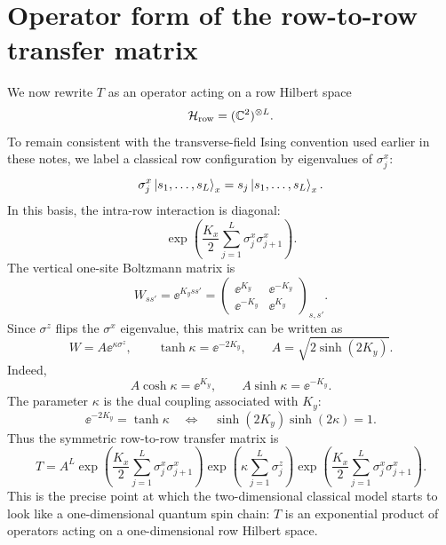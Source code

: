 \section{Operator form of the row-to-row transfer matrix}
\label{sec:2d-classical-ising-row-transfer-operator}

We now rewrite $T$ as an operator acting on a row Hilbert space
\begin{equation}
    \mathcal{H}_{\rm row}=(\mathbb{C}^2)^{\otimes L}.
\end{equation}
To remain consistent with the transverse-field Ising convention used earlier in
these notes, we label a classical row configuration by eigenvalues of
$\sigma_j^x$:
\begin{equation}
\label{eq:2d-classical-ising-x-basis}
    \sigma_j^x\left|s_1,\ldots,s_L\right\rangle_x
    =
    s_j\left|s_1,\ldots,s_L\right\rangle_x .
\end{equation}
In this basis, the intra-row interaction is diagonal:
\begin{equation}
\label{eq:2d-classical-ising-horizontal-operator}
    \exp\left(
        \frac{K_x}{2}\sum_{j=1}^{L}\sigma_j^x\sigma_{j+1}^x
    \right).
\end{equation}
The vertical one-site Boltzmann matrix is
\begin{equation}
\label{eq:2d-classical-ising-vertical-weight}
    W_{ss'}=\ee^{K_yss'}
    =
    \begin{pmatrix}
        \ee^{K_y} & \ee^{-K_y} \\
        \ee^{-K_y} & \ee^{K_y}
    \end{pmatrix}_{s,s'} .
\end{equation}
Since $\sigma^z$ flips the $\sigma^x$ eigenvalue, this matrix can be written as
\begin{equation}
\label{eq:2d-classical-ising-vertical-exp}
    W=A\ee^{\kappa\sigma^z},
    \qquad
    \tanh\kappa=\ee^{-2K_y},
    \qquad
    A=\sqrt{2\sinh(2K_y)} .
\end{equation}
Indeed,
\begin{equation}
    A\cosh\kappa=\ee^{K_y},
    \qquad
    A\sinh\kappa=\ee^{-K_y}.
\end{equation}
The parameter $\kappa$ is the dual coupling associated with $K_y$:
\begin{equation}
\label{eq:2d-classical-ising-kappa-dual}
    \ee^{-2K_y}=\tanh\kappa
    \quad\Longleftrightarrow\quad
    \sinh(2K_y)\sinh(2\kappa)=1 .
\end{equation}
Thus the symmetric row-to-row transfer matrix is
\begin{equation}
\label{eq:2d-classical-ising-symmetric-transfer-operator}
    T
    =
    A^L
    \exp\left(
        \frac{K_x}{2}\sum_{j=1}^{L}\sigma_j^x\sigma_{j+1}^x
    \right)
    \exp\left(
        \kappa\sum_{j=1}^{L}\sigma_j^z
    \right)
    \exp\left(
        \frac{K_x}{2}\sum_{j=1}^{L}\sigma_j^x\sigma_{j+1}^x
    \right).
\end{equation}
This is the precise point at which the two-dimensional classical model starts to
look like a one-dimensional quantum spin chain: $T$ is an exponential product of
operators acting on a one-dimensional row Hilbert space.

